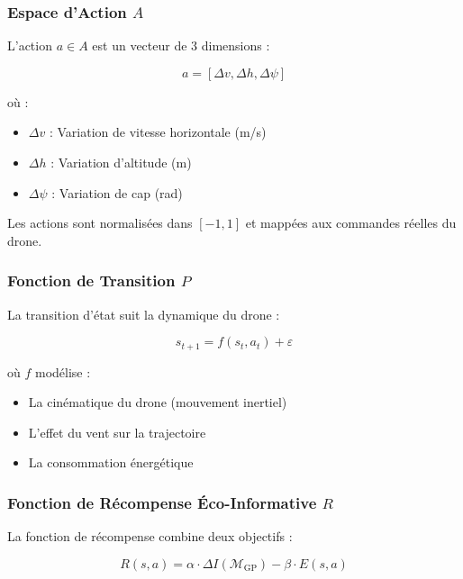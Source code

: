 \documentclass[12pt,a4paper]{article}
\begin{document}
\subsubsection{Espace d'Action $A$}

L'action $a \in A$ est un vecteur de 3 dimensions :

\begin{equation}
a = [\Delta v, \Delta h, \Delta \psi]
\end{equation}

où :
\begin{itemize}
    \item $\Delta v$ : Variation de vitesse horizontale (m/s)
    \item $\Delta h$ : Variation d'altitude (m)
    \item $\Delta \psi$ : Variation de cap (rad)
\end{itemize}

Les actions sont normalisées dans $[-1, 1]$ et mappées aux commandes réelles du drone.

\subsubsection{Fonction de Transition $P$}

La transition d'état suit la dynamique du drone :

\begin{equation}
s_{t+1} = f(s_t, a_t) + \varepsilon
\end{equation}

où $f$ modélise :
\begin{itemize}
    \item La cinématique du drone (mouvement inertiel)
    \item L'effet du vent sur la trajectoire
    \item La consommation énergétique
\end{itemize}

\subsubsection{Fonction de Récompense Éco-Informative $R$}

La fonction de récompense combine deux objectifs :

\begin{equation}
R(s, a) = \alpha \cdot \Delta I(\mathcal{M}_{\text{GP}}) - \beta \cdot E(s, a)
\end{equation}
\end{document}
